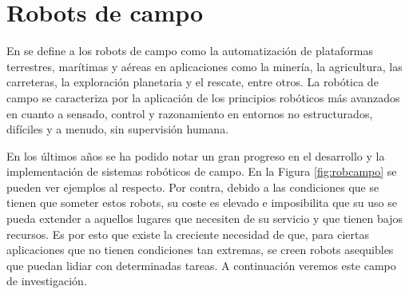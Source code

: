 \setcounter{footnote}{11} %


\section{Robots de campo}
\label{sec:robotcampo}

En \cite{thorpe2003field} se define a los robots de campo como la automatización de plataformas terrestres, marítimas y aéreas en aplicaciones como la minería, la agricultura, las carreteras, la exploración planetaria y el rescate, entre otros. La robótica de campo se caracteriza por la aplicación de los principios robóticos más avanzados en cuanto a sensado, control y razonamiento en entornos no estructurados, difíciles y a menudo, sin supervisión humana. 

En los últimos años se ha podido notar un gran progreso en el desarrollo y la implementación de sistemas robóticos de campo. En la Figura \ref{fig:robcampo} se pueden ver ejemplos al respecto. Por contra, debido a las condiciones que se tienen que someter estos robots, su coste es elevado e imposibilita que su uso se pueda extender a aquellos lugares que necesiten de su servicio y que tienen bajos recursos. Es por esto que existe la creciente necesidad de que, para ciertas aplicaciones que no tienen condiciones tan extremas, se creen robots asequibles que puedan lidiar con determinadas tareas. A continuación veremos este campo de investigación. 

